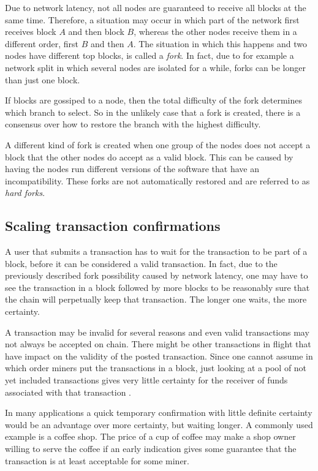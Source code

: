 Due to network latency, not all nodes are guaranteed to receive
all blocks at the same time. Therefore, a situation may occur in
which part of the network first receives block $A$ and then block $B$,
whereas the other nodes receive them in a different order, first $B$ and then
$A$. The situation in which this happens and two nodes have different
top blocks, is called a \textit{fork}. In fact, due to for example a network
split in which several nodes are isolated for a while, forks can be
longer than just one block.

If blocks are gossiped to a node, then the total
difficulty of the fork determines
which branch to select. So in the unlikely case that a fork is
created, there is a consensus over how to restore the branch with
the highest difficulty.

A different kind of fork is created when one group of the nodes does
not accept a block that the other nodes do accept as a valid block. This
can be caused by having the nodes run different versions of the
software that have an incompatibility. These forks are not
automatically restored and are referred to as \textit{hard forks}.

\subsection{Scaling transaction confirmations}

A user that submits a transaction has to wait for the transaction to
be part of a block, before it can be considered a valid
transaction. In fact, due to the previously described fork possibility caused
by network latency, one may have to see the transaction in a block
followed by more blocks to be reasonably sure that the chain will
perpetually keep that transaction. The longer one waits, the more certainty.

A transaction may be invalid for several reasons and even valid
transactions may not always be accepted on chain. There might be other transactions in
flight that have impact on the validity of the posted
transaction. Since one cannot assume in which order miners put
the transactions in a block, just looking at a pool of not yet
included transactions gives very little certainty for the receiver of
funds associated with that transaction \cite{karame2012double}.

In many applications a quick temporary confirmation with little
definite certainty would be an advantage over more certainty, but
waiting longer. A commonly used example is a coffee shop. The price of
a cup of coffee may make a shop owner willing to serve the coffee if an
early indication gives some guarantee that the transaction is at least
acceptable for some miner.

